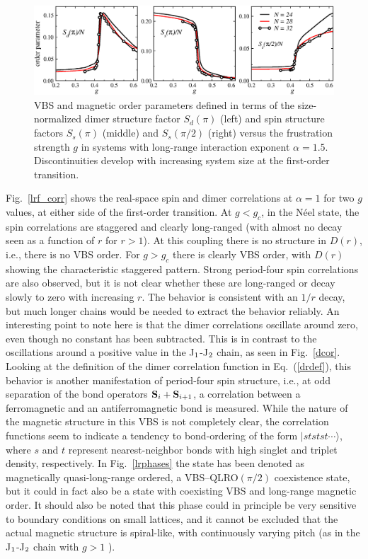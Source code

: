 \documentclass[draft,numberedheadings]{aipproc}
\begin{document}
\begin{figure}
\includegraphics[width=14cm, clip]{lrf_jumps.eps}
\caption{VBS and magnetic order parameters defined in terms of the size-normalized dimer structure factor $S_d(\pi)$ (left) and spin structure 
factors $S_s(\pi)$ (middle) and $S_s(\pi/2)$ (right) versus the frustration strength $g$ in systems with long-range interaction exponent $\alpha=1.5$. 
Discontinuities develop with increasing system size at the first-order transition.}
\label{lrf_jumps}
\end{figure}

Fig.~\ref{lrf_corr} shows the real-space spin and dimer correlations at $\alpha=1$ for two $g$ values, at either side of the first-order transition. 
At $g<g_c$, in the N\'eel state, the spin correlations are staggered and clearly long-ranged (with almost no decay seen as a function of $r$ for 
$r>1$). At this coupling there is no structure in $D(r)$, i.e., there is no VBS order. For $g>g_c$ there is clearly VBS order, with $D(r)$ showing 
the characteristic staggered pattern. Strong period-four spin correlations are also observed, but it is not clear whether these are long-ranged or 
decay slowly to zero with increasing $r$. The behavior is consistent with an $1/r$ decay, but much longer chains would be needed to extract the behavior 
reliably. An interesting point to note here is that the dimer correlations oscillate around zero, even though no constant has been subtracted. This 
is in contrast to the oscillations around a positive value in the J$_{\rm 1}$-J$_{\rm 2}$ chain, as seen in Fig.~\ref{dcor}. Looking at the definition of 
the dimer correlation function in Eq.~(\ref{drdef}), this behavior is another manifestation of period-four spin structure, i.e., at odd separation of 
the bond operators ${\bf S}_i+{\bf S}_{i+1}$, a correlation between a ferromagnetic and an antiferromagnetic bond is measured. While the nature of 
the magnetic structure in this VBS is not completely clear, the correlation functions seem to indicate a tendency to bond-ordering of the form
$|ststst\cdots\rangle$, where $s$ and $t$ represent nearest-neighbor bonds with high singlet and triplet density, respectively. In Fig.~\ref{lrphases} the 
state has been denoted as magnetically quasi-long-range ordered, a VBS--QLRO$(\pi/2)$ coexistence state, but it could in fact also be a state with coexisting 
VBS and long-range magnetic order. It should also be noted that this phase could in principle be very sensitive to boundary conditions on small lattices, 
and it cannot be excluded that the actual magnetic structure is spiral-like, with continuously varying pitch (as in the J$_{\rm 1}$-J$_{\rm 2}$ chain 
with $g>1$ \cite{kumar}).
\end{document}
